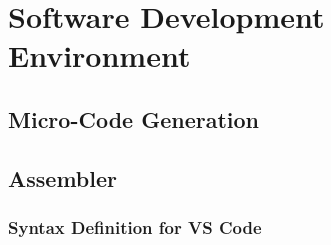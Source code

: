 \chapter{Software Development Environment}\label{cha:software}
\section{Micro-Code Generation}
\section{Assembler}
\subsection{Syntax Definition for VS Code}